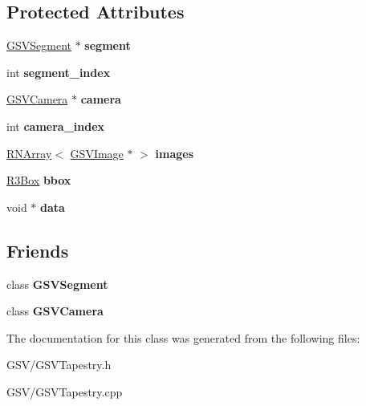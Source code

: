 \subsection*{Protected Attributes}
\begin{DoxyCompactItemize}
\item 
\hyperlink{class_g_s_v_segment}{G\+S\+V\+Segment} $\ast$ {\bfseries segment}\hypertarget{class_g_s_v_tapestry_a63973bdb62bedab49ba5eafea22a9862}{}\label{class_g_s_v_tapestry_a63973bdb62bedab49ba5eafea22a9862}

\item 
int {\bfseries segment\+\_\+index}\hypertarget{class_g_s_v_tapestry_a9d552de7abbabbf61563d343c7d62a2c}{}\label{class_g_s_v_tapestry_a9d552de7abbabbf61563d343c7d62a2c}

\item 
\hyperlink{class_g_s_v_camera}{G\+S\+V\+Camera} $\ast$ {\bfseries camera}\hypertarget{class_g_s_v_tapestry_a17761143cb2a5acb99e719336b8abd8f}{}\label{class_g_s_v_tapestry_a17761143cb2a5acb99e719336b8abd8f}

\item 
int {\bfseries camera\+\_\+index}\hypertarget{class_g_s_v_tapestry_a04477eb796dc942ef5c2a33dba61da7f}{}\label{class_g_s_v_tapestry_a04477eb796dc942ef5c2a33dba61da7f}

\item 
\hyperlink{class_r_n_array}{R\+N\+Array}$<$ \hyperlink{class_g_s_v_image}{G\+S\+V\+Image} $\ast$ $>$ {\bfseries images}\hypertarget{class_g_s_v_tapestry_a8bb0c5de09c29d7e13eaa1e9c378a0fe}{}\label{class_g_s_v_tapestry_a8bb0c5de09c29d7e13eaa1e9c378a0fe}

\item 
\hyperlink{class_r3_box}{R3\+Box} {\bfseries bbox}\hypertarget{class_g_s_v_tapestry_a3f03edda697d3e4204f74c7e7cfef446}{}\label{class_g_s_v_tapestry_a3f03edda697d3e4204f74c7e7cfef446}

\item 
void $\ast$ {\bfseries data}\hypertarget{class_g_s_v_tapestry_a0b60d23d7026d81b9fceed34a3bc1335}{}\label{class_g_s_v_tapestry_a0b60d23d7026d81b9fceed34a3bc1335}

\end{DoxyCompactItemize}
\subsection*{Friends}
\begin{DoxyCompactItemize}
\item 
class {\bfseries G\+S\+V\+Segment}\hypertarget{class_g_s_v_tapestry_a24c71f4a2a67fb7c97d76dffafabda73}{}\label{class_g_s_v_tapestry_a24c71f4a2a67fb7c97d76dffafabda73}

\item 
class {\bfseries G\+S\+V\+Camera}\hypertarget{class_g_s_v_tapestry_a11d7ec5d0fe0afe3176f615989fa528c}{}\label{class_g_s_v_tapestry_a11d7ec5d0fe0afe3176f615989fa528c}

\end{DoxyCompactItemize}


The documentation for this class was generated from the following files\+:\begin{DoxyCompactItemize}
\item 
G\+S\+V/G\+S\+V\+Tapestry.\+h\item 
G\+S\+V/G\+S\+V\+Tapestry.\+cpp\end{DoxyCompactItemize}
